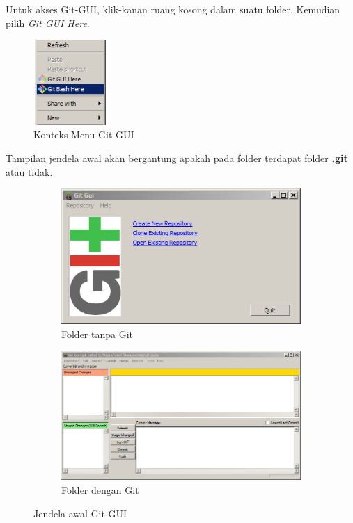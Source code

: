 \documentclass[12pt]{book}
\begin{document}
	Untuk akses Git-GUI, klik-kanan ruang kosong dalam suatu folder.
	Kemudian pilih \textit{Git GUI Here}.
	
	\begin{figure}[!ht]
		\centering
		\includegraphics[width=80pt]{images/githere0}
		\caption{Konteks Menu Git GUI}
	\end{figure}

	Tampilan jendela awal akan bergantung apakah pada folder terdapat folder \textbf{.git} atau tidak.
	
	\begin{figure}[!ht]
		\centering
		\begin{subfigure}[b]{0.25\textwidth}
			\includegraphics[width=\textwidth]{images/gitgui0}
			\caption{Folder tanpa Git}
		\end{subfigure}
		\begin{subfigure}[b]{0.55\textwidth}
			\includegraphics[width=\textwidth]{images/gitgui1}
			\caption{Folder dengan Git}
		\end{subfigure}
		\caption{Jendela awal Git-GUI}
	\end{figure}
\end{document}
